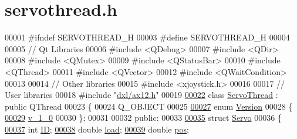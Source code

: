 \hypertarget{servothread_8h_source}{}\section{servothread.\+h}

\begin{DoxyCode}
00001 \textcolor{preprocessor}{#ifndef SERVOTHREAD\_H}
00003 \textcolor{preprocessor}{#define SERVOTHREAD\_H}
00004 
00005 \textcolor{comment}{// Qt Libraries}
00006 \textcolor{preprocessor}{#include <QDebug>}
00007 \textcolor{preprocessor}{#include <QDir>}
00008 \textcolor{preprocessor}{#include <QMutex>}
00009 \textcolor{preprocessor}{#include <QStatusBar>}
00010 \textcolor{preprocessor}{#include <QThread>}
00011 \textcolor{preprocessor}{#include <QVector>}
00012 \textcolor{preprocessor}{#include <QWaitCondition>}
00013 
00014 \textcolor{comment}{// Other libraries}
00015 \textcolor{preprocessor}{#include <xjoystick.h>}
00016 
00017 \textcolor{comment}{// User libraries}
00018 \textcolor{preprocessor}{#include "\hyperlink{ax12_8h}{dxl/ax12.h}"}
00019 
\hypertarget{servothread_8h_source_l00022}{}\hyperlink{class_servo_thread}{00022} \textcolor{keyword}{class }\hyperlink{class_servo_thread}{ServoThread} : \textcolor{keyword}{public} QThread
00023 \{
00024     Q\_OBJECT
00025     
\hypertarget{servothread_8h_source_l00027}{}\hyperlink{class_servo_thread_aeccce0ac6a969e2ee7cbe91687e2d085}{00027}     \textcolor{keyword}{enum} \hyperlink{class_servo_thread_aeccce0ac6a969e2ee7cbe91687e2d085}{Version} 
00028     \{
\hypertarget{servothread_8h_source_l00029}{}\hyperlink{class_servo_thread_aeccce0ac6a969e2ee7cbe91687e2d085a319b6bf2cb120faeefbd0a5118ece7e3}{00029}         \hyperlink{class_servo_thread_aeccce0ac6a969e2ee7cbe91687e2d085a319b6bf2cb120faeefbd0a5118ece7e3}{v\_1\_0}
00030     \};
00031     
00032 \textcolor{keyword}{public}:
00033     
\hypertarget{servothread_8h_source_l00035}{}\hyperlink{struct_servo_thread_1_1_servo}{00035}     \textcolor{keyword}{struct }\hyperlink{struct_servo_thread_1_1_servo}{Servo} 
00036     \{
\hypertarget{servothread_8h_source_l00037}{}\hyperlink{struct_servo_thread_1_1_servo_a06b514c42113aa85fd1703fc88fca7ce}{00037}         \textcolor{keywordtype}{int} \hyperlink{struct_servo_thread_1_1_servo_a06b514c42113aa85fd1703fc88fca7ce}{ID};         
\hypertarget{servothread_8h_source_l00038}{}\hyperlink{struct_servo_thread_1_1_servo_ae378d77acf16b306649c87fdb8df677e}{00038}         \textcolor{keywordtype}{double} \hyperlink{struct_servo_thread_1_1_servo_ae378d77acf16b306649c87fdb8df677e}{load};    
\hypertarget{servothread_8h_source_l00039}{}\hyperlink{struct_servo_thread_1_1_servo_a9fa0aa56944b9b0bb9d66303d5bd4b59}{00039}         \textcolor{keywordtype}{double} \hyperlink{struct_servo_thread_1_1_servo_a9fa0aa56944b9b0bb9d66303d5bd4b59}{pos};     

\end{DoxyCode}
